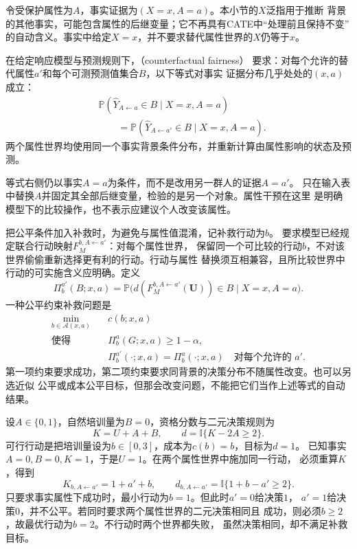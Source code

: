 令受保护属性为\(A\)，事实证据为\((X=x,A=a)\)。本小节的\(X\)泛指用于推断
背景的其他事实，可能包含属性的后继变量；它不再具有CATE中“处理前且保持不变”
的自动含义。事实中给定\(X=x\)，并不要求替代属性世界的\(X\)仍等于\(x\)。
\begin{definition}[反事实公平]
  \label{def:causal-counterfactual-fairness}
  在给定响应模型与预测规则下，（counterfactual fairness）
  要求：对每个允许的替代属性\(a'\)和每个可测预测值集合\(B\)，以下等式对事实
  证据分布几乎处处的\((x,a)\)成立：
  \begin{equation}
    \begin{aligned}
      &\mathbb P(\widehat Y_{A\leftarrow a}\in B\mid X=x,A=a)\\
      &\qquad=
      \mathbb P(\widehat Y_{A\leftarrow a'}\in B\mid X=x,A=a).
    \end{aligned}
    \label{eq:causal-counterfactual-fairness}
  \end{equation}
  两个属性世界均使用同一个事实背景条件分布，并重新计算由属性影响的状态及预测。
\end{definition}

等式右侧仍以事实\(A=a\)为条件，而不是改用另一群人的证据\(A=a'\)。
只在输入表中替换\(A\)并固定其全部后继变量，检验的是另一个对象。属性干预在这里
是明确模型下的比较操作，也不表示应建议个人改变该属性。

把公平条件加入补救时，为避免与属性值混淆，记补救行动为\(b\)。
要求模型已经规定联合行动映射\(F_M^{b,A\leftarrow a'}\)：对每个属性世界，
保留同一个可比较的行动\(b\)，不对该世界偷偷重新选择更有利的行动。行动与属性
替换须互相兼容，且所比较世界中行动的可实施含义应明确。定义
\[
  \Pi_b^{a'}(B;x,a)
  =
  \mathbb P\bigl(
    d(F_M^{b,A\leftarrow a'}(\bm U))\in B
    \mid X=x,A=a
  \bigr).
\]
一种公平约束补救问题是
\begin{equation}
  \begin{aligned}
    \min_{b\in\mathcal A(x,a)}\quad &c(b;x,a)\\
    \text{使得}\quad
    &\Pi_b^a(G;x,a)\geq1-\alpha,\\
    &\Pi_b^{a'}(\cdot;x,a)=\Pi_b^a(\cdot;x,a)
      \quad\text{对每个允许的 }a'.
  \end{aligned}
  \label{eq:causal-fair-recourse-objective}
\end{equation}
第一项约束要求成功，第二项约束要求同背景的决策分布不随属性改变。也可以另选近似
公平或成本公平目标，但那会改变问题，不能把它们当作上述等式的自动结果。

\begin{example}[成功行动未必满足公平约束]
  \label{ex:causal-fair-recourse}
  设\(A\in\{0,1\}\)，自然培训量为\(B=0\)，资格分数与二元决策规则为
  \[
    K=U+A+B,\qquad d=\mathbb I\{K-2A\geq2\}.
  \]
  可行行动是把培训量设为\(b\in[0,3]\)，成本为\(c(b)=b\)，目标为\(d=1\)。
  已知事实\(A=0,B=0,K=1\)，于是\(U=1\)。在两个属性世界中施加同一行动，
  必须重算\(K\)，得到
  \[
    K_{b,A\leftarrow a'}=1+a'+b,\qquad
    d_{b,A\leftarrow a'}=\mathbb I\{1+b-a'\geq2\}.
  \]
  只要求事实属性下成功时，最小行动为\(b=1\)。但此时\(a'=0\)给决策\(1\)，
  \(a'=1\)给决策\(0\)，并不公平。若同时要求两个属性世界的二元决策相同且
  成功，则必须\(b\geq2\)，故最优行动为\(b=2\)。不行动时两个世界都失败，
  虽然决策相同，却不满足补救目标。
\end{example}

